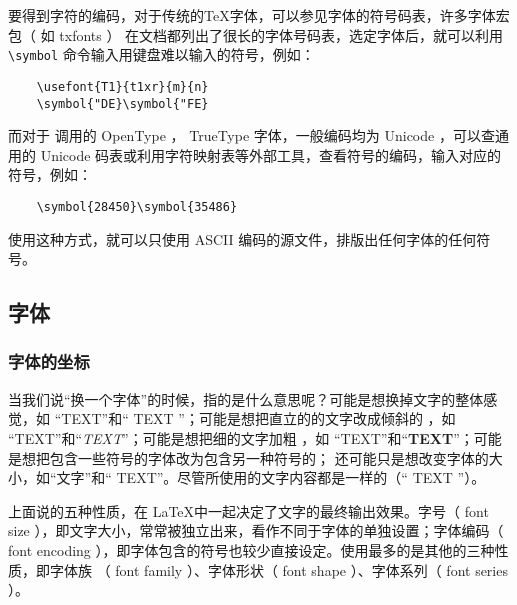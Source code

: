 要得到字符的编码，对于传统的\TeX 字体，可以参见字体的符号码表，许多字体宏包（ 如 txfonts ） 在文档都列出了很长的字体号码表，选定字体后，就可以利用\verb|\symbol| 命令输入用键盘难以输入的符号，例如：

\begin{minipage}[t]{0.45\textwidth}
\begin{lstlisting}
    \usefont{T1}{t1xr}{m}{n}
    \symbol{"DE}\symbol{"FE}
\end{lstlisting}
\end{minipage}
\hfill
\begin{minipage}[t]{0.45\textwidth}
\end{minipage}

而对于 \XeTeX 调用的 OpenType ， TrueType 字体，一般编码均为 Unicode ，可以查通用的 Unicode 码表或利用字符映射表等外部工具，查看符号的编码，输入对应的符号，例如：

\begin{minipage}[t]{0.45\textwidth}
\begin{lstlisting}
    \symbol{28450}\symbol{35486}
\end{lstlisting}
\end{minipage}
\hfill
\begin{minipage}[t]{0.45\textwidth}
\end{minipage}

使用这种方式，就可以只使用 ASCII 编码的源文件，排版出任何字体的任何符号。

\subsection{字体}

\subsubsection{字体的坐标} \label{sec:font}

当我们说“换一个字体”的时候，指的是什么意思呢？可能是想换掉文字的整体感觉，如 “{\ttfamily TEXT}”和“ {\sffamily TEXT} ”；可能是想把直立的的文字改成倾斜的 ，如 “TEXT”和“\textit{TEXT}”；可能是想把细的文字加粗 ，如 “TEXT”和“\textbf{TEXT}”；可能是想把包含一些符号的字体改为包含另一种符号的； 还可能只是想改变字体的大小，如“文字”和“{ TEXT}”。尽管所使用的文字内容都是一样的（“ TEXT ”）。

上面说的五种性质，在 \LaTeX 中一起决定了文字的最终输出效果。字号（ font size ），即文字大小，常常被独立出来，看作不同于字体的单独设置；字体编码（ font encoding ），即字体包含的符号也较少直接设定。使用最多的是其他的三种性质，即字体族 （ font family ）、字体形状（ font shape ）、字体系列（ font series ）。

